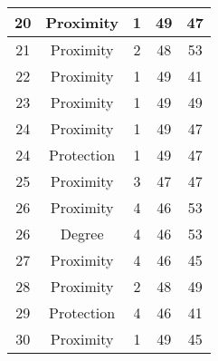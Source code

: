\documentclass[results.tex]{subfiles}
\begin{document}
\begin{center}
\begin{tabular}{| c || c | c | c | c |}
            \hline
            20                      & Proximity                    & 1                      & 49                      & 47                   \\
            \hline
            21                      & Proximity                    & 2                      & 48                      & 53                   \\
            \hline
            22                      & Proximity                    & 1                      & 49                      & 41                   \\
            \hline
            23                      & Proximity                    & 1                      & 49                      & 49                   \\
            \hline
            24                      & Proximity                    & 1                      & 49                      & 47                   \\
            \hline
            24                      & Protection                   & 1                      & 49                      & 47                   \\
            \hline
            25                      & Proximity                    & 3                      & 47                      & 47                   \\
            \hline
            26                      & Proximity                    & 4                      & 46                      & 53                   \\
            \hline
            26                      & Degree                       & 4                      & 46                      & 53                   \\
            \hline
            27                      & Proximity                    & 4                      & 46                      & 45                   \\
            \hline
            28                      & Proximity                    & 2                      & 48                      & 49                   \\
            \hline
            29                      & Protection                   & 4                      & 46                      & 41                   \\
            \hline
            30                      & Proximity                    & 1                      & 49                      & 45                   \\

\end{tabular}
\end{center}
\end{document}
